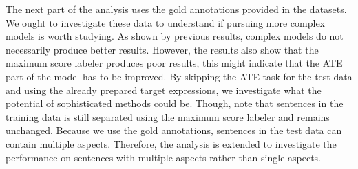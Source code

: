 \documentclass[american, oneside]{ecsgdp}
\begin{document}
\begin{table}[htbp]
\centering
\caption{Performance of various methods on sentiment classification with gold data}
\label{tab:sentiment-perf-gold}
\end{table}

The next part of the analysis uses the gold annotations provided in the datasets. We ought to investigate these data to understand if pursuing more complex models is worth studying. As shown by previous results, complex models do not necessarily produce better results. However, the results also show that the maximum score labeler produces poor results, this might indicate that the ATE part of the model has to be improved. By skipping the ATE task for the test data and using the already prepared target expressions, we investigate what the potential of sophisticated methods could be. Though, note that sentences in the training data is still separated using the maximum score labeler and remains unchanged. Because we use the gold annotations, sentences in the test data can contain multiple aspects. Therefore, the analysis is extended to investigate the performance on sentences with multiple aspects rather than single aspects.
\end{document}
